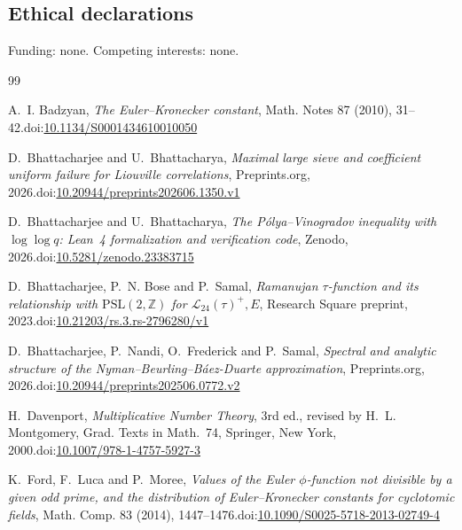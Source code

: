 \documentclass[12pt]{amsart}
\numberwithin{equation}{section}
\newcommand{\zenodoID}{10.5281/zenodo.23383715}
\theoremstyle{definition}
\begin{document}
\subsection*{Ethical declarations}
Funding: none. Competing interests: none.

\normalsize

\begingroup\raggedright
\begin{thebibliography}{99}
\normalsize

 A.~I. Badzyan, \emph{The Euler--Kronecker constant}, Math. Notes 87
(2010), 31--42.\newline doi:\href{https://doi.org/10.1134/S0001434610010050}{10.1134/S0001434610010050}

 D.~Bhattacharjee and U.~Bhattacharya, \emph{Maximal large sieve and coefficient
uniform failure for Liouville correlations}, Preprints.org, 2026.\newline doi:\href{https://doi.org/10.20944/preprints202606.1350.v1}{10.20944/preprints202606.1350.v1}

 D.~Bhattacharjee and U.~Bhattacharya, \emph{The P\'olya--Vinogradov inequality
with $\log\log q$: Lean~4 formalization and verification code}, Zenodo, 2026.\newline doi:\href{https://doi.org/\zenodoID}{\zenodoID}

 D.~Bhattacharjee, P.~N. Bose and P.~Samal, \emph{Ramanujan $\tau$-function and
its relationship with $\mathrm{PSL}(2,\mathbb Z)$ for $\mathcal L_{24}(\tau)^+,E$}, Research Square
preprint, 2023.\newline doi:\href{https://doi.org/10.21203/rs.3.rs-2796280/v1}{10.21203/rs.3.rs-2796280/v1}

 D.~Bhattacharjee, P.~Nandi, O.~Frederick and P.~Samal, \emph{Spectral and
analytic structure of the Nyman--Beurling--B\'aez-Duarte approximation}, Preprints.org,
2026.\newline doi:\href{https://doi.org/10.20944/preprints202506.0772.v2}{10.20944/preprints202506.0772.v2}

 H.~Davenport, \emph{Multiplicative Number Theory}, 3rd ed., revised by
H.~L. Montgomery, Grad. Texts in Math.~74, Springer, New York, 2000.\newline doi:\href{https://doi.org/10.1007/978-1-4757-5927-3}{10.1007/978-1-4757-5927-3}

 K.~Ford, F.~Luca and P.~Moree, \emph{Values of the Euler $\phi$-function not
divisible by a given odd prime, and the distribution of Euler--Kronecker constants for cyclotomic
fields}, Math. Comp. 83 (2014), 1447--1476.\newline doi:\href{https://doi.org/10.1090/S0025-5718-2013-02749-4}{10.1090/S0025-5718-2013-02749-4}


\end{thebibliography}
\end{document}
